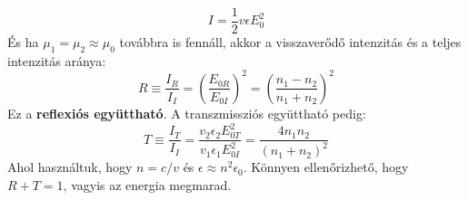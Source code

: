 \documentclass[../main.tex]{subfiles}
\begin{document}
\begin{equation}
    I = \frac{1}{2} v \epsilon E_0^2
\end{equation}
És ha $\mu_1 = \mu_2 \approx \mu_0$ továbbra is fennáll, akkor a visszaverődő intenzitás és a teljes intenzitás aránya:
\begin{equation}
    R \equiv \frac{I_R}{I_I} = \left( \frac{E_{0R}}{E_{0I}} \right)^2 = \left(\frac{n_1 - n_2}{n_1 + n_2}\right)^2
\end{equation}
Ez a \textbf{reflexiós együttható}. A transzmissziós együttható pedig:
\begin{equation}
    T \equiv \frac{I_T}{I_I} = \frac{v_2 \epsilon_2 E_{0T}^2}{v_1 \epsilon_1 E_{0I}^2} = \frac{4 n_1 n_2}{(n_1 + n_2)^2}
\end{equation}
Ahol használtuk, hogy $n = c/v$ és $\epsilon \approx n^2 \epsilon_0$. Könnyen ellenőrizhető, hogy $R + T = 1$, vagyis az energia megmarad.
\end{document}
